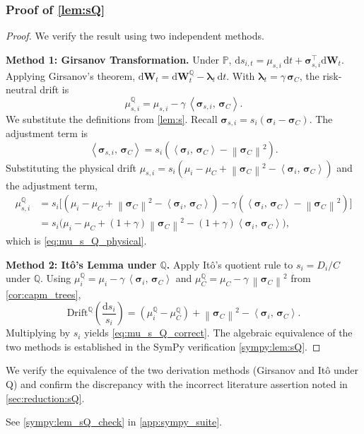 \documentclass[11pt,letterpaper,oneside]{article}
\numberwithin{equation}{section}
\newcommand{\1}{\mathbf{1}}
\newcommand{\diff}{\mathrm{d}}
\newcommand{\norm}[1]{\left\lVert #1\right\rVert}
\newcommand{\ip}[2]{\left\langle #1,\,#2\right\rangle}
\begin{document}
\subsubsection{Proof of \cref{lem:sQ}}\label{app:proof:lem:sQ}
\begin{proof}
We verify the result using two independent methods.

  	\textbf{Method 1: Girsanov Transformation.}
Under $\mathbb{P}$, $\diff s_{i,t} = \mu_{s,i}\,\diff t + \bm{\sigma}_{s,i}^{\top}\diff\bm{W}_t$. Applying Girsanov's theorem, $\diff\bm{W}_t = \diff\bm{W}_t^{\mathbb{Q}} - \bm{\lambda}_t\,\diff t$. With $\bm{\lambda}_t=\gamma\,\bm{\sigma}_C$, the risk-neutral drift is
\[
  \mu_{s,i}^{\mathbb{Q}} = \mu_{s,i} - \gamma\,\ip{\bm{\sigma}_{s,i}}{\bm{\sigma}_C}.
\]
We substitute the definitions from \cref{lem:s}. Recall $\bm{\sigma}_{s,i} = s_i(\bm{\sigma}_i-\bm{\sigma}_C)$. The adjustment term is
\[
    \ip{\bm{\sigma}_{s,i}}{\bm{\sigma}_C} = s_i(\ip{\bm{\sigma}_i}{\bm{\sigma}_C}-
\norm{\bm{\sigma}_C}^2).
\]
Substituting the physical drift $\mu_{s,i} = s_i(\mu_i-\mu_C+
\norm{\bm{\sigma}_C}^2-\ip{\bm{\sigma}_i}{\bm{\sigma}_C})$ and the adjustment term,
\begin{align}
    \mu_{s,i}^{\mathbb{Q}} &= s_i\Big[ (\mu_i-\mu_C+
\norm{\bm{\sigma}_C}^2-\ip{\bm{\sigma}_i}{\bm{\sigma}_C}) - \gamma(\ip{\bm{\sigma}_i}{\bm{\sigma}_C}-
\norm{\bm{\sigma}_C}^2) \Big] \\
    &= s_i\Big(\mu_i-\mu_C+(1+\gamma)
\norm{\bm{\sigma}_C}^2-(1+\gamma)\ip{\bm{\sigma}_i}{\bm{\sigma}_C}\Big),
\end{align}
which is \eqref{eq:mu_s_Q_physical}.

         	\textbf{Method 2: It\^o's Lemma under $\mathbb{Q}$.}
Apply It\^o's quotient rule to $s_i=D_i/C$ under $\mathbb{Q}$. Using $\mu_i^{\mathbb{Q}}=\mu_i-\gamma\,\ip{\bm{\sigma}_i}{\bm{\sigma}_C}$ and $\mu_C^{\mathbb{Q}}=\mu_C-
\gamma\,\norm{\bm{\sigma}_C}^2$ from \cref{cor:capm_trees},
\[ 
  	\text{Drift}^{\mathbb{Q}}\!\left(\frac{\diff s_i}{s_i}\right) = (\mu_i^{\mathbb{Q}}-\mu_C^{\mathbb{Q}}) + 
\norm{\bm{\sigma}_C}^2 - \ip{\bm{\sigma}_i}{\bm{\sigma}_C}.
\]
Multiplying by $s_i$ yields \eqref{eq:mu_s_Q_correct}. The algebraic equivalence of the two methods is established in the SymPy verification \cref{sympy:lem:sQ}.
\end{proof}

\begin{sympycheck}[title={Verification: Risk-neutral share drift derivation (\cref{lem:sQ})}]\label{sympy:lem:sQ}
We verify the equivalence of the two derivation methods (Girsanov and It\^o under Q) and confirm the discrepancy with the incorrect literature assertion noted in \cref{sec:reduction:sQ}.

See \cref{sympy:lem_sQ_check} in \cref{app:sympy_suite}.\end{sympycheck}
\end{document}
